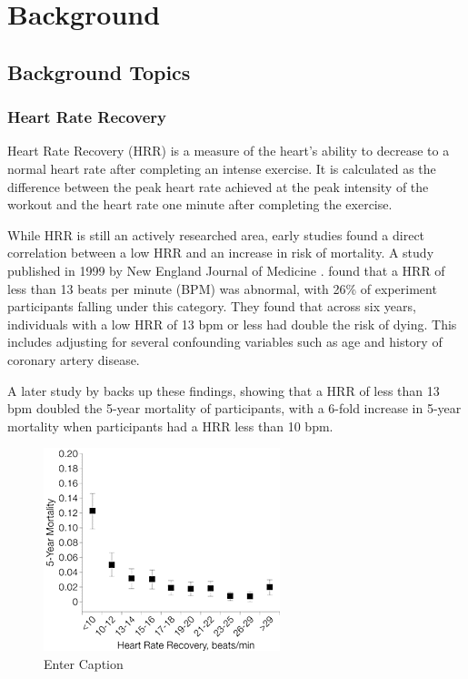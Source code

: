 \documentclass{l4proj}
\begin{document}
\chapter{Background}
\label{sec:background}

\section{Background Topics}
\label{sec:backgroundtopics}

\subsection{Heart Rate Recovery}
\label{sec:backgroundhrr}

Heart Rate Recovery (HRR) is a measure of the heart’s ability to decrease to a normal heart rate after completing an intense exercise. It is calculated as the difference between the peak heart rate achieved at the peak intensity of the workout and the heart rate one minute after completing the exercise. 

While HRR is still an actively researched area, early studies found a direct correlation between a low HRR and an increase in risk of mortality. A study published in 1999 by New England Journal of Medicine \cite{Cole1999HeartRate}. found that a HRR of less than 13 beats per minute (BPM) was abnormal, with 26\% of experiment participants falling under this category. They found that across six years, individuals with a low HRR of 13 bpm or less had double the risk of dying. This includes adjusting for several confounding variables such as age and history of coronary artery disease.

A later study by \cite{HRR2000} backs up these findings, showing that a HRR of less than 13 bpm doubled the 5-year mortality of participants, with a 6-fold increase in 5-year mortality when participants had a HRR less than 10 bpm.

\begin{figure}[h!]
    \centering
    \includegraphics[width=0.5\linewidth]{dissertation//dissImages/BackgroundHRR.png}
    \caption{Enter Caption}
    \label{fig:enter-label}
\end{figure}
\end{document}
